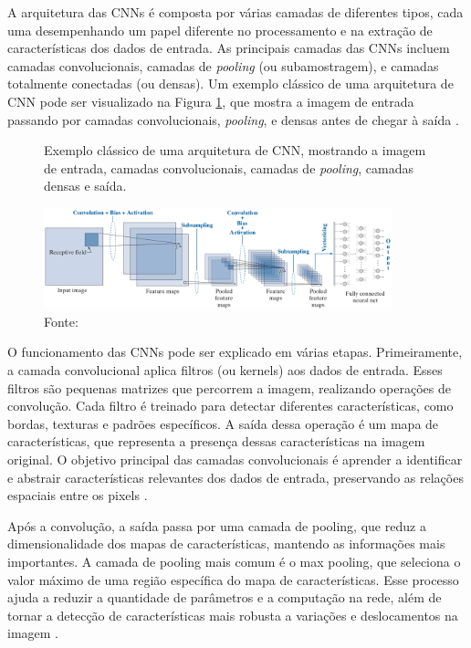 A arquitetura das CNNs é composta por várias camadas de diferentes tipos, cada uma desempenhando um papel diferente no processamento e na extração de características dos dados de entrada. As principais camadas das CNNs incluem camadas convolucionais, camadas de \textit{pooling} (ou subamostragem), e camadas totalmente conectadas (ou densas). Um exemplo clássico de uma arquitetura de CNN pode ser visualizado na Figura \ref{fig:cnnexample}, que mostra a imagem de entrada passando por camadas convolucionais, \textit{pooling}, e densas antes de chegar à saída \cite{o2015introduction}.

\begin{figure}[b!]
    \centering  
    \caption{Exemplo clássico de uma arquitetura de CNN, mostrando a imagem de entrada, camadas convolucionais, camadas de \textit{pooling}, camadas densas e saída.} 
    \includegraphics[width=0.9\textwidth]{fig/cnn_example_better.png}
    \caption*{Fonte: }
    \label{fig:cnnexample}
\end{figure} %



O funcionamento das CNNs pode ser explicado em várias etapas. Primeiramente, a camada convolucional aplica filtros (ou kernels) aos dados de entrada. Esses filtros são pequenas matrizes que percorrem a imagem, realizando operações de convolução. Cada filtro é treinado para detectar diferentes características, como bordas, texturas e padrões específicos. A saída dessa operação é um mapa de características, que representa a presença dessas características na imagem original. O objetivo principal das camadas convolucionais é aprender a identificar e abstrair características relevantes dos dados de entrada, preservando as relações espaciais entre os pixels \cite{aggarwal2018neural}.

Após a convolução, a saída passa por uma camada de pooling, que reduz a dimensionalidade dos mapas de características, mantendo as informações mais importantes. A camada de pooling mais comum é o max pooling, que seleciona o valor máximo de uma região específica do mapa de características. Esse processo ajuda a reduzir a quantidade de parâmetros e a computação na rede, além de tornar a detecção de características mais robusta a variações e deslocamentos na imagem \cite{aggarwal2018neural}.

